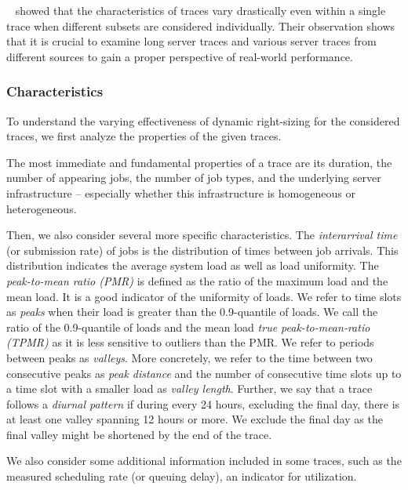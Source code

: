 \citeauthor{Amvrosiadis2018}~\cite{Amvrosiadis2018} showed that the characteristics of traces vary drastically even within a single trace when different subsets are considered individually. Their observation shows that it is crucial to examine long server traces and various server traces from different sources to gain a proper perspective of real-world performance.

\subsubsection{Characteristics}

To understand the varying effectiveness of dynamic right-sizing for the considered traces, we first analyze the properties of the given traces.

The most immediate and fundamental properties of a trace are its duration, the number of appearing jobs, the number of job types, and the underlying server infrastructure -- especially whether this infrastructure is homogeneous or heterogeneous.

Then, we also consider several more specific characteristics. The \emph{interarrival time} (or submission rate) of jobs is the distribution of times between job arrivals. This distribution indicates the average system load as well as load uniformity. The \emph{peak-to-mean ratio (PMR)} is defined as the ratio of the maximum load and the mean load. It is a good indicator of the uniformity of loads. We refer to time slots as \emph{peaks} when their load is greater than the 0.9-quantile of loads. We call the ratio of the 0.9-quantile of loads and the mean load \emph{true peak-to-mean-ratio (TPMR)} as it is less sensitive to outliers than the PMR. We refer to periods between peaks as \emph{valleys}. More concretely, we refer to the time between two consecutive peaks as \emph{peak distance} and the number of consecutive time slots up to a time slot with a smaller load as \emph{valley length}. Further, we say that a trace follows a \emph{diurnal pattern} if during every 24 hours, excluding the final day, there is at least one valley spanning 12 hours or more. We exclude the final day as the final valley might be shortened by the end of the trace.

We also consider some additional information included in some traces, such as the measured scheduling rate (or queuing delay), an indicator for utilization.

